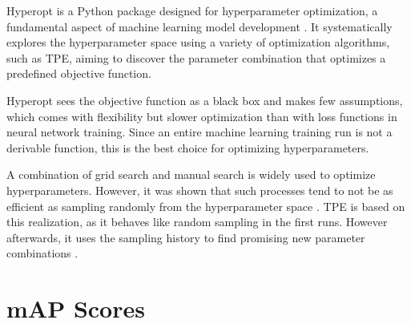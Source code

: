\documentclass[10pt]{book}
\begin{document}
Hyperopt is a Python package designed for hyperparameter optimization, a fundamental aspect of machine learning model development \cite{bergstra2013making}. It systematically explores the hyperparameter space using a variety of optimization algorithms, such as \ac{TPE}, aiming to discover the parameter combination that optimizes a predefined objective function. %

Hyperopt sees the objective function as a black box and makes few assumptions, which comes with flexibility but slower optimization than with loss functions in neural network training. Since an entire machine learning training run is not a derivable function, this is the best choice for optimizing hyperparameters.

A combination of grid search and manual search is widely used to optimize hyperparameters. However, it was shown that such processes tend to not be as efficient as sampling randomly from the hyperparameter space \cite{bergstra2012random}. \ac{TPE} is based on this realization, as it behaves like random sampling in the first runs. However afterwards, it uses the sampling history to find promising new parameter combinations \cite{bergstra2011algorithms}. 



\section{mAP Scores}
\end{document}

